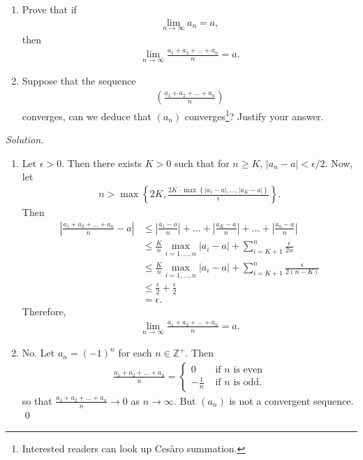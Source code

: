 \documentclass[11pt]{amsart}
\theoremstyle{plain}
\numberwithin{equation}{section}
\begin{document}
\begin{enumerate}[label=\textbf{(\roman*)}]
    \itemsep 0em
    \item Prove that if
\begin{align*}
    \lim_{n\to\infty}a_{n}=a,
\end{align*}
then 
\begin{align*}
    \lim_{n\to\infty}\frac{a_{1}+a_{2}+\dots+a_{n}}{n}=a.
\end{align*}
\item Suppose that the sequence
\begin{align*}
    \left(\frac{a_{1}+a_{2}+\dots+a_{n}}{n}\right)
\end{align*}
converges, can we deduce that $\left(a_{n}\right)$ converges\footnote{Interested readers can look up Cesàro summation.}? Justify your answer. 
\end{enumerate}
\noindent\emph{Solution.}
\begin{enumerate}[label=\textbf{(\roman*)}]
    \itemsep 0em
    \item Let $\epsilon>0$. Then there exists $K>0$ such that for $n\geq K$, $\left|a_{n}-a\right|<\epsilon/2$. Now, let
\begin{align*}
    n>\max\left\{2K,\frac{2K\cdot\max\left\{\left|a_{1}-a\right|,\dots,\left|a_{K}-a\right|\right\}}{\epsilon}\right\}.
\end{align*}
Then
\begin{align*}
    \left|\frac{a_{1}+a_{2}+\dots+a_{n}}{n}-a\right|&\leq\left|\frac{a_{1}-a}{n}\right|+\dots+\left|\frac{a_{K}-a}{n}\right|+\dots+\left|\frac{a_{n}-a}{n}\right|
    \\
    &\leq\frac{K}{n}\max_{i=1,\dots,n}\left|a_{i}-a\right|+\sum_{i=K+1}^{n}\frac{\epsilon}{2n}
    \\
    &\leq\frac{K}{n}\max_{i=1,\dots,n}\left|a_{i}-a\right|+\sum_{i=K+1}^{n}\frac{\epsilon}{2(n-K)}
    \\
    &\leq\frac{\epsilon}{2}+\frac{\epsilon}{2}
    \\
    &=\epsilon.
\end{align*}
Therefore, 
\begin{align*}
    \lim_{n\to\infty}\frac{a_{1}+a_{2}+\dots+a_{n}}{n}=a.
\end{align*}
\item No. Let $a_{n}=(-1)^{n}$ for each $n\in\mathbb{Z}^{+}$. Then
\begin{align*}
    \frac{a_{1}+a_{2}+\dots+a_{n}}{n}=\begin{cases}
        0&\text{ if }n\text{ is even}
        \\
        -\frac{1}{n}&\text{ if }n\text{ is odd}.
    \end{cases}
\end{align*}
so that $\frac{a_{1}+a_{2}+\dots+a_{n}}{n}\to0$ as $n\to\infty$. But $\left(a_{n}\right)$ is not a convergent sequence. \qed 
\end{enumerate}
\end{document}

